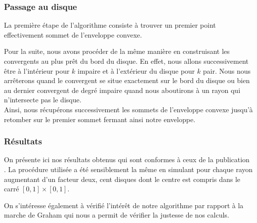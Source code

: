 \subsubsection{Passage au disque}

La première étape de l'algorithme consiste à trouver un premier point effectivement sommet de l'enveloppe convexe. 

Pour la suite, nous avons procéder de la même manière en construisant les convergents au plus prêt du bord du disque. En effet, nous allons successivement être à l'intérieur pour $k$ impaire et à l'extérieur du disque pour $k$ pair. Nous nous arrêterons quand le convergent se situe exactement sur le bord du disque ou bien au dernier convergent de degré impaire quand nous aboutirons à un rayon qui n'intersecte pas le disque.\\

Ainsi, nous récupérons successivement les sommets de l'enveloppe convexe jusqu'à retomber sur le premier sommet fermant ainsi notre enveloppe.


\subsubsection{Résultats}


On présente ici nos résultats obtenus qui sont conformes à ceux de la publication \cite{HarPeled98}. La procédure utilisée a été sensiblement la même en simulant pour chaque rayon augmentant d'un facteur deux, cent disques dont le centre est compris dans le carré $[0,1]\times[0,1]$.

On s'intéresse également à vérifié l'intérêt de notre algorithme par rapport à la marche de Graham qui nous a permit de vérifier la justesse de nos calculs. 

